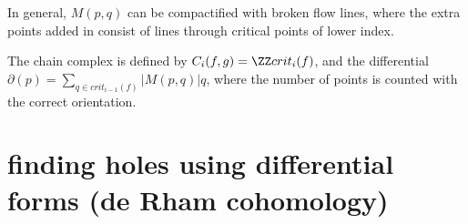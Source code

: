 \documentclass[12pt]{article}
\begin{document}
In general, $M(p, q)$ can be compactified with broken flow lines, where the
extra points added in consist of lines through critical points of lower index.  

\begin{definition*}
  The chain complex is defined by $C_i(f, g) = \ZZ crit_i(f)$, and the
  differential $\partial(p) = \sum_{q \in crit_{i-1}(f)} |M(p, q)| q$, where the
  number of points is counted with the correct orientation. 
\end{definition*}

\section{finding holes using differential forms (de Rham cohomology)}
\end{document}
